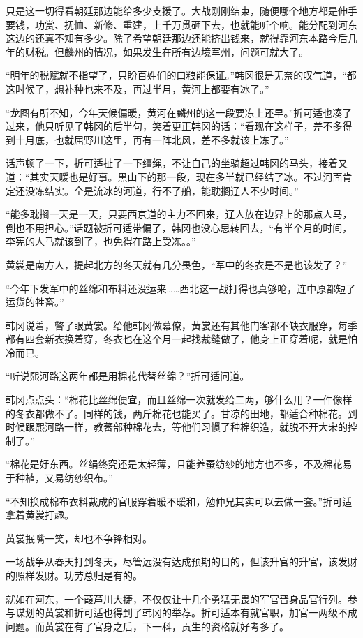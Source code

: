 只是这一切得看朝廷那边能给多少支援了。大战刚刚结束，随便哪个地方都是伸手要钱，功赏、抚恤、新修、重建，上千万贯砸下去，也就能听个响。能分配到河东这边的还真不知有多少。除了希望朝廷那边还能挤出钱来，就得靠河东本路今后几年的财税。但麟州的情况，如果发生在所有边境军州，问题可就大了。

“明年的税赋就不指望了，只盼百姓们的口粮能保证。”韩冈很是无奈的叹气道，“都这时候了，想补种也来不及，再过半月，黄河上都要有冰了。”

“龙图有所不知，今年天候偏暖，黄河在麟州的这一段要冻上还早。”折可适也凑了过来，他只听见了韩冈的后半句，笑着更正韩冈的话：“看现在这样子，差不多得到十月底，也就屈野川这里，再有一阵北风，差不多就该上冻了。”

话声顿了一下，折可适扯了一下缰绳，不让自己的坐骑超过韩冈的马头，接着又道：“其实天暖也是好事。黑山下的那一段，现在多半就已经结了冰。不过河面肯定还没冻结实。全是流冰的河道，行不了船，能耽搁辽人不少时间。”

“能多耽搁一天是一天，只要西京道的主力不回来，辽人放在边界上的那点人马，倒也不用担心。”话题被折可适带偏了，韩冈也没心思转回去，“有半个月的时间，李宪的人马就该到了，也免得在路上受冻。。”

黄裳是南方人，提起北方的冬天就有几分畏色，“军中的冬衣是不是也该发了？”

“今年下发军中的丝绵和布料还没运来……西北这一战打得也真够呛，连中原都短了运货的牲畜。”

韩冈说着，瞥了眼黄裳。给他韩冈做幕僚，黄裳还有其他门客都不缺衣服穿，每季都有四套新衣换着穿，冬衣也在这个月一起找裁缝做了，他身上正穿着呢，就是怕冷而已。

“听说熙河路这两年都是用棉花代替丝绵？”折可适问道。

韩冈点点头：“棉花比丝绵便宜，而且丝绵一次就发给二两，够什么用？一件像样的冬衣都做不了。同样的钱，两斤棉花也能买了。甘凉的田地，都适合种棉花。到时候跟熙河路一样，教蕃部种棉花去，等他们习惯了种棉织造，就脱不开大宋的控制了。”

“棉花是好东西。丝绢终究还是太轻薄，且能养蚕纺纱的地方也不多，不及棉花易于种植，又易纺纱织布。”

“不知换成棉布衣料裁成的官服穿着暖不暖和，勉仲兄其实可以去做一套。”折可适拿着黄裳打趣。

黄裳抿嘴一笑，却也不争锋相对。

一场战争从春天打到冬天，尽管远没有达成预期的目的，但该升官的升官，该发财的照样发财。功劳总归是有的。

就如在河东，一个葭芦川大捷，不仅仅让十几个勇猛无畏的军官晋身品官行列。参与谋划的黄裳和折可适也得到了韩冈的举荐。折可适本有就官职，加官一两级不成问题。而黄裳在有了官身之后，下一科，贡生的资格就好考多了。

